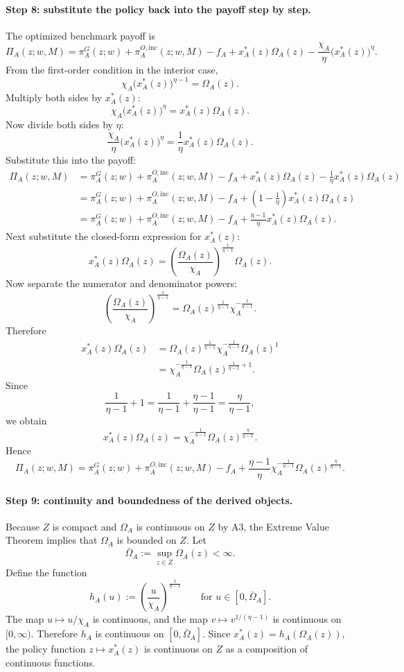 \paragraph{Step 8: substitute the policy back into the payoff step by step.}
The optimized benchmark payoff is
\[
\Pi_A(z;w,M)
=
\pi_A^G(z;w)+\pi_A^{O,\mathrm{inc}}(z;w,M)-f_A
+x_A^*(z)\Omega_A(z)-\frac{\chi_A}{\eta}\bigl(x_A^*(z)\bigr)^\eta.
\]
From the first-order condition in the interior case,
\[
\chi_A \bigl(x_A^*(z)\bigr)^{\eta-1}=\Omega_A(z).
\]
Multiply both sides by $x_A^*(z)$:
\[
\chi_A \bigl(x_A^*(z)\bigr)^\eta=x_A^*(z)\Omega_A(z).
\]
Now divide both sides by $\eta$:
\[
\frac{\chi_A}{\eta}\bigl(x_A^*(z)\bigr)^\eta=\frac{1}{\eta}x_A^*(z)\Omega_A(z).
\]
Substitute this into the payoff:
\begin{align*}
\Pi_A(z;w,M)
&=
\pi_A^G(z;w)+\pi_A^{O,\mathrm{inc}}(z;w,M)-f_A
+x_A^*(z)\Omega_A(z)-\frac{1}{\eta}x_A^*(z)\Omega_A(z)\\
&=
\pi_A^G(z;w)+\pi_A^{O,\mathrm{inc}}(z;w,M)-f_A
+\left(1-\frac{1}{\eta}\right)x_A^*(z)\Omega_A(z)\\
&=
\pi_A^G(z;w)+\pi_A^{O,\mathrm{inc}}(z;w,M)-f_A
+\frac{\eta-1}{\eta}x_A^*(z)\Omega_A(z).
\end{align*}
Next substitute the closed-form expression for $x_A^*(z)$:
\[
x_A^*(z)\Omega_A(z)
=
\left(\frac{\Omega_A(z)}{\chi_A}\right)^{\frac{1}{\eta-1}}\Omega_A(z).
\]
Now separate the numerator and denominator powers:
\[
\left(\frac{\Omega_A(z)}{\chi_A}\right)^{\frac{1}{\eta-1}}
=
\Omega_A(z)^{\frac{1}{\eta-1}}\chi_A^{-\frac{1}{\eta-1}}.
\]
Therefore
\begin{align*}
x_A^*(z)\Omega_A(z)
&=
\Omega_A(z)^{\frac{1}{\eta-1}}\chi_A^{-\frac{1}{\eta-1}}\Omega_A(z)^1\\
&=
\chi_A^{-\frac{1}{\eta-1}}\Omega_A(z)^{\frac{1}{\eta-1}+1}.
\end{align*}
Since
\[
\frac{1}{\eta-1}+1=\frac{1}{\eta-1}+\frac{\eta-1}{\eta-1}=\frac{\eta}{\eta-1},
\]
we obtain
\[
x_A^*(z)\Omega_A(z)
=
\chi_A^{-\frac{1}{\eta-1}}\Omega_A(z)^{\frac{\eta}{\eta-1}}.
\]
Hence
\begin{equation}
\Pi_A(z;w,M)
=
\pi_A^G(z;w)+\pi_A^{O,\mathrm{inc}}(z;w,M)-f_A
+\frac{\eta-1}{\eta}\chi_A^{-\frac{1}{\eta-1}}\Omega_A(z)^{\frac{\eta}{\eta-1}}.
\label{eq:p2A_payoff_rev}
\end{equation}

\paragraph{Step 9: continuity and boundedness of the derived objects.}
Because $Z$ is compact and $\Omega_A$ is continuous on $Z$ by A3, the Extreme Value Theorem implies that $\Omega_A$ is bounded on $Z$. Let
\[
\bar\Omega_A:=\sup_{z\in Z}\Omega_A(z)<\infty.
\]
Define the function
\[
h_A(u):=\left(\frac{u}{\chi_A}\right)^{\frac{1}{\eta-1}}
\qquad\text{for }u\in[0,\bar\Omega_A].
\]
The map $u\mapsto u/\chi_A$ is continuous, and the map $v\mapsto v^{1/(\eta-1)}$ is continuous on $[0,\infty)$. Therefore $h_A$ is continuous on $[0,\bar\Omega_A]$. Since $x_A^*(z)=h_A(\Omega_A(z))$, the policy function $z\mapsto x_A^*(z)$ is continuous on $Z$ as a composition of continuous functions.

